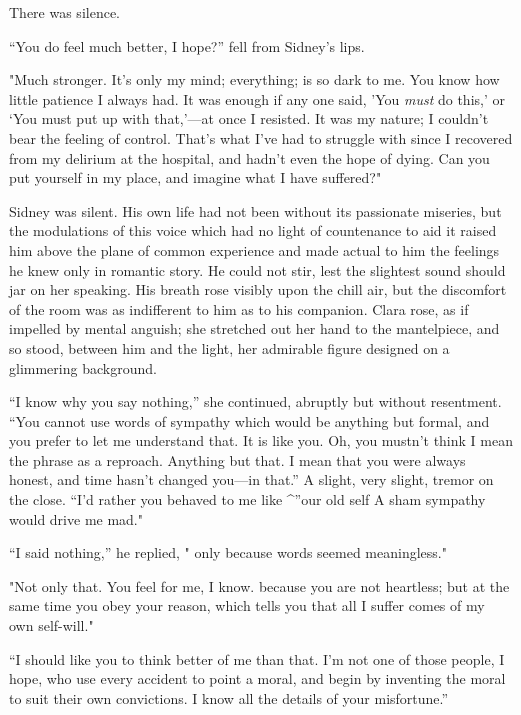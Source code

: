 There was silence.

``You do feel much better, I hope?'' fell from Sidney's lips.

"Much stronger. It's only my mind; everything; is so dark to me. You
know how little patience I always had. It was enough if any one said,
'You \emph{must} do this,' or `You must put up with that,'---at once I
resisted. It was my nature; I couldn't bear the feeling of control.
That's what I've had to struggle with since I recovered from my delirium
at the hospital, and hadn't even the hope of dying. Can you put yourself
in my place, and imagine what I have suffered?"

Sidney was silent. His own life had not been without its passionate
miseries, but the modulations of this voice which had no light of
countenance to aid it raised him above the
{\protect\hypertarget{84}{}{}} plane of common experience and made
actual to him the feelings he knew only in romantic story. He could not
stir, lest the slightest sound should jar on her speaking. His breath
rose visibly upon the chill air, but the discomfort of the room was as
indifferent to him as to his companion. Clara rose, as if impelled by
mental anguish; she stretched out her hand to the mantelpiece, and so
stood, between him and the light, her admirable figure designed on a
glimmering background.

``I know why you say nothing,'' she continued, abruptly but without
resentment. ``You cannot use words of sympathy which would be anything
but formal, and you prefer to let me understand that. It is like you.
Oh, you mustn't think I mean the phrase as a reproach. Anything but
that. I mean that you were always honest, and time hasn't changed
you---in that.'' A slight, very slight, tremor on the close. ``I'd
rather you behaved to me like \^{}''our old self A sham sympathy would
drive me mad."

``I said nothing,'' he replied, " only because words seemed
meaningless."

"Not only that. You feel for me, I know. {\protect\hypertarget{85}{}{}}
because you are not heartless; but at the same time you obey your
reason, which tells you that all I suffer comes of my own self-will."

``I should like you to think better of me than that. I'm not one of
those people, I hope, who use every accident to point a moral, and begin
by inventing the moral to suit their own convictions. I know all the
details of your misfortune.''


